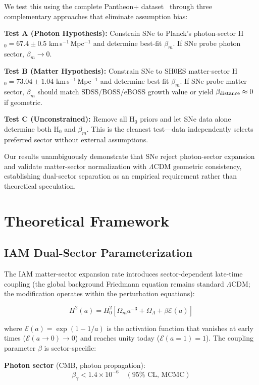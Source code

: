 \documentclass[twocolumn,superscriptaddress,prd,amsmath,amssymb]{revtex4-2}
\begin{document}
We test this using the complete Pantheon+ dataset~\cite{Brout2022} through three complementary approaches that eliminate assumption bias:

\textbf{Test A (Photon Hypothesis):} Constrain SNe to Planck's photon-sector H$_0 = 67.4 \pm 0.5$ km\,s$^{-1}$\,Mpc$^{-1}$ and determine best-fit $\beta_m$. If SNe probe photon sector, $\beta_m \to 0$.

\textbf{Test B (Matter Hypothesis):} Constrain SNe to SH0ES matter-sector H$_0 = 73.04 \pm 1.04$ km\,s$^{-1}$\,Mpc$^{-1}$ and determine best-fit $\beta_m$. If SNe probe matter sector, $\beta_m$ should match SDSS/BOSS/eBOSS growth value or yield $\beta_{\rm distance} \approx 0$ if geometric.

\textbf{Test C (Unconstrained):} Remove all H$_0$ priors and let SNe data alone determine both H$_0$ and $\beta_m$. This is the cleanest test—data independently selects preferred sector without external assumptions.

Our results unambiguously demonstrate that SNe reject photon-sector expansion and validate matter-sector normalization with $\Lambda$CDM geometric consistency, establishing dual-sector separation as an empirical requirement rather than theoretical speculation.

\section{Theoretical Framework}

\subsection{IAM Dual-Sector Parameterization}

The IAM matter-sector expansion rate introduces sector-dependent late-time coupling (the global background Friedmann equation remains standard $\Lambda$CDM; the modification operates within the perturbation equations):

\begin{equation}
H^2(a) = H_0^2\left[\Omega_m a^{-3} + \Omega_\Lambda + \beta \mathcal{E}(a)\right]
\label{eq:friedmann}
\end{equation}

where $\mathcal{E}(a) = \exp(1 - 1/a)$ is the activation function that vanishes at early times ($\mathcal{E}(a \to 0) \to 0$) and reaches unity today ($\mathcal{E}(a=1) = 1$). The coupling parameter $\beta$ is sector-specific:

\textbf{Photon sector} (CMB, photon propagation):
\begin{equation}
\beta_\gamma < 1.4 \times 10^{-6} \quad (95\% \text{ CL, MCMC})
\end{equation}
\end{document}
